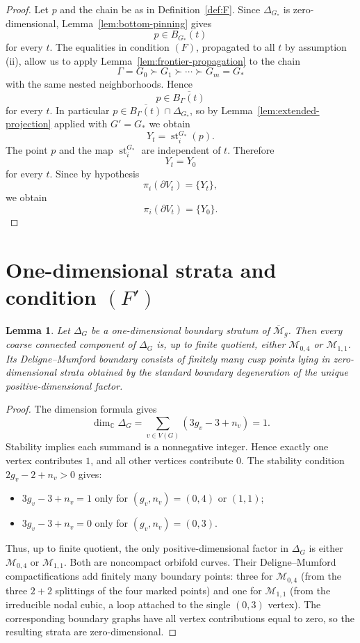 \documentclass[12pt]{article}
\theoremstyle{plain}
\newtheorem{lemma}[theorem]{Lemma}
\theoremstyle{definition}
\theoremstyle{remark}
\newcommand{\C}{\mathbb C}
\newcommand{\M}{\mathcal M}
\newcommand{\bMg}{\overline{\M}_g}
\newcommand{\st}{\operatorname{st}}
\begin{document}
\begin{proof}
Let \(p\) and the chain be as in Definition~\ref{def:F}.  Since \(\Delta_{G_*}\) is zero-dimensional, Lemma~\ref{lem:bottom-pinning} gives
\[
p\in B_{G_*}(t)
\]
for every \(t\).  The equalities in condition \((F)\), propagated to all \(t\) by assumption (ii), allow us to apply Lemma~\ref{lem:frontier-propagation} to the chain
\[
\Gamma=G_0\succ G_1\succ\cdots \succ G_m=G_*
\]
with the same nested neighborhoods.  Hence
\[
p\in \overline{B_\Gamma(t)}
\]
for every \(t\).  In particular \(p\in \overline{B_\Gamma(t)}\cap \Delta_{G_*}\), so by Lemma~\ref{lem:extended-projection} applied with \(G'=G_*\) we obtain
\[
Y_t = \st_i^{G_*}(p).
\]
The point \(p\) and the map \(\st_i^{G_*}\) are independent of \(t\).  Therefore
\[
Y_t = Y_0
\]
for every \(t\).  Since by hypothesis
\[
\pi_i(\partial V_t)=\{Y_t\},
\]
we obtain
\[
\pi_i(\partial V_t)=\{Y_0\}.
\]
\end{proof}

\section{One-dimensional strata and condition \((F')\)}\label{sec:oneprime}

\begin{lemma}\label{lem:one-dim-strata}
Let \(\Delta_G\) be a one-dimensional boundary stratum of \(\bMg\).  Then every coarse connected component of \(\Delta_G\) is, up to finite quotient, either \(\M_{0,4}\) or \(\M_{1,1}\).  Its Deligne--Mumford boundary consists of finitely many cusp points lying in zero-dimensional strata obtained by the standard boundary degeneration of the unique positive-dimensional factor.
\end{lemma}

\begin{proof}
The dimension formula gives
\[
\dim_\C \Delta_G=\sum_{v\in V(G)}(3g_v-3+n_v)=1.
\]
Stability implies each summand is a nonnegative integer.  Hence exactly one vertex contributes \(1\), and all other vertices contribute \(0\).  The stability condition \(2g_v-2+n_v>0\) gives:

\begin{itemize}
  \item \(3g_v-3+n_v=1\) only for \((g_v,n_v)=(0,4)\) or \((1,1)\);
  \item \(3g_v-3+n_v=0\) only for \((g_v,n_v)=(0,3)\).
\end{itemize}

Thus, up to finite quotient, the only positive-dimensional factor in \(\Delta_G\) is either \(\M_{0,4}\) or \(\M_{1,1}\).  Both are noncompact orbifold curves.  Their Deligne--Mumford compactifications add finitely many boundary points: three for \(\M_{0,4}\) (from the three \(2+2\) splittings of the four marked points) and one for \(\M_{1,1}\) (from the irreducible nodal cubic, a loop attached to the single \((0,3)\) vertex).  The corresponding boundary graphs have all vertex contributions equal to zero, so the resulting strata are zero-dimensional.
\end{proof}
\end{document}
